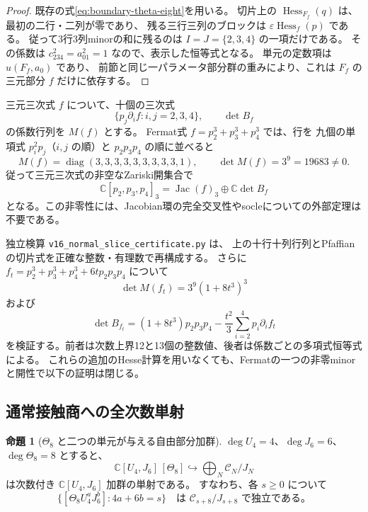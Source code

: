 \documentclass[a4paper,11pt]{ltjsarticle}
\theoremstyle{definition}
\newtheorem{theorem}{命題}[section]
\begin{document}
\begin{proof}
既存の式\eqref{eq:boundary-theta-eight}を用いる。
切片上の $\operatorname{Hess}_{F_f}(q)$ は、最初の二行・二列が零であり、
残る三行三列のブロックは $\varepsilon\operatorname{Hess}_f(p)$ である。
従って3行3列minorの和に残るのは
$I=J=\{2,3,4\}$ の一項だけである。
その係数は $c_{234}^2=a_{01}^2=1$ なので、表示した恒等式となる。
単元の定数項は $u(F_f,a_0)$ であり、
前節と同じ一パラメータ部分群の重みにより、これは $F_f$ の三元部分 $f$ だけに依存する。
\end{proof}

三元三次式 $f$ について、十個の三次式
\begin{equation}\label{eq:v16-ten-ternary-cubics}
 \{p_j\partial_i f: i,j=2,3,4\},\qquad \det B_f
\end{equation}
の係数行列を $M(f)$ とする。
Fermat式 $f=p_2^3+p_3^3+p_4^3$ では、行を
九個の単項式 $p_i^2p_j$（$i,j$ の順）と $p_2p_3p_4$ の順に並べると
\begin{equation}\label{eq:v16-fermat-normal-minor}
 M(f)=\operatorname{diag}(3,3,3,3,3,3,3,3,3,1),
 \qquad\det M(f)=3^9=19683\ne0.
\end{equation}
従って三元三次式の非空なZariski開集合で
\[
 \mathbb C[p_2,p_3,p_4]_3
   =\operatorname{Jac}(f)_3\oplus\mathbb C\det B_f
\]
となる。この非零性には、Jacobian環の完全交叉性やsocleについての外部定理は不要である。

独立検算 \nolinkurl{v16_normal_slice_certificate.py} は、
上の十行十列行列とPfaffianの切片式を正確な整数・有理数で再構成する。
さらに $f_t=p_2^3+p_3^3+p_4^3+6t p_2p_3p_4$ について
\[
 \det M(f_t)=3^9(1+8t^3)^3
\]
および
\[
 \det B_{f_t}
 =(1+8t^3)p_2p_3p_4-\frac{t^2}{3}\sum_{i=2}^4p_i\partial_i f_t
\]
を検証する。前者は次数上界12と13個の整数値、後者は係数ごとの多項式恒等式による。
これらの追加のHesse計算を用いなくても、Fermatの一つの非零minorと開性で以下の証明は閉じる。

\subsection{通常接触商への全次数単射}

\begin{theorem}[$\Theta_8$ と二つの単元が与える自由部分加群]
\label{thm:v16-hessian-socle-injection}
$\deg U_4=4$、$\deg J_6=6$、$\deg\Theta_8=8$ とすると、
\begin{equation}\label{eq:v16-theta-module-injection}
 \mathbb C[U_4,J_6]\,[\Theta_8]
 \hookrightarrow
 \bigoplus_N\mathcal C_N/J_N
\end{equation}
は次数付き $\mathbb C[U_4,J_6]$ 加群の単射である。
すなわち、各 $s\ge0$ について
\[
 \{[\Theta_8U_4^aJ_6^b]:4a+6b=s\}
 \quad\text{は }\mathcal C_{s+8}/J_{s+8}\text{ で独立である。}
\]
\end{theorem}
\end{document}
